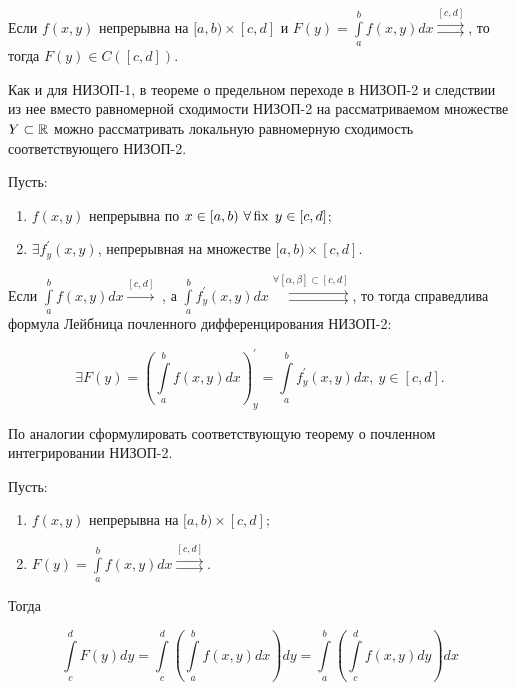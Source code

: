 \documentclass[../../main.tex]{subfiles}
\begin{document}
	\begin{crl*}
		Если $f(x, y)$ непрерывна на $[a, b) \times [c, d]$ и $F(y) = 
		\int\limits_a^b f(x, y) dx \overset{[c, d]}\rightrightarrows$, то тогда 
		$F(y) \in C([c, d])$.
	\end{crl*}

	\begin{rem}
		Как и для НИЗОП-1, в теореме о предельном переходе в НИЗОП-2 и следствии из 
		нее вместо равномерной сходимости НИЗОП-2 на рассматриваемом множестве $Y 
		\subset \mathbb{R}$ можно рассматривать локальную равномерную сходимость 
		соответствующего НИЗОП-2.
	\end{rem}

	\begin{thm}
		Пусть:

		\begin{enumerate}
			\item $f(x, y)$ непрерывна по $x \in [a, b)\ \forall \operatorname{fix} \; y \in [c, d]$;
			\item $\exists f^{'}_{y} (x, y)$, непрерывная на множестве $[a, b) \times 
			[c, d]$.
		\end{enumerate}

		Если $\int\limits_a^b f(x, y) dx \overset{[c, d]}\rightarrow\;$, а 
		$\int\limits_a^b f^{'}_y (x, y) dx \overset{\forall [\alpha, \beta] \subset 
		[c, d]}{\rightrightarrows}$, то тогда справедлива формула Лейбница 
		почленного дифференцирования НИЗОП-2:
		
		\[
		\exists F(y) = \left( \int\limits_a^b f(x, y) dx \right)^{'}_y = 
		\int\limits_a^b f^{'}_y (x, y) dx, \ y \in [c, d].
		\]
	\end{thm}

	\begin{exc}
		По аналогии сформулировать соответствующую теорему о почленном 
		интегрировании НИЗОП-2.
	\end{exc}

	\begin{eans}
	\begin{thm}
		Пусть:
		\begin{enumerate}
			\item $f(x, y)$ непрерывна на $[a, b) \times [c, d];$
			\item $F(y) = \int\limits_a^b f(x, y) dx \overset{[c, 
			d]}{\rightrightarrows}.$
		\end{enumerate}
	
		Тогда
		
		\[
			\int\limits_c^d F(y) dy = \int\limits_c^d \left( \int\limits_a^b f(x, y) dx 
			\right) dy = \int\limits_a^b \left( \int\limits_c^d f(x, y) dy \right) dx
		\]
	\end{thm}
	\end{eans}
\end{document}
